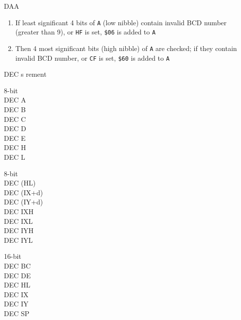 \begin{basedescript}{
    \desclabelstyle{\multilinelabel}
    \desclabelwidth{3cm}}
\begin{DetailItem}{DAA}
        \begin{enumerate}
            \item If least significant 4 bits of {\tt A} (low nibble) contain invalid BCD number (greater than 9), or {\tt HF} is set, {\tt \$06} is added to {\tt A}
            \item Then 4 most significant bits (high nibble) of {\tt A} are checked; if they contain invalid BCD number, or {\tt CF} is set, {\tt \$60} is added to {\tt A}
        \end{enumerate}
		
        \begin{DetailEffects}[p]
            \FlagsDAA
        \end{DetailEffects}
		
        \begin{DetailTiming}
        \end{DetailTiming}

    \end{DetailItem}

    \begin{DetailItem}{DEC s}
        {rement}
        {}

        \begin{DetailVariants}
            \textnormal{8-bit}\\
            DEC A\\
            DEC B\\
            DEC C\\
            DEC D\\
            DEC E\\
            DEC H\\
            DEC L

            \columnbreak
            \textnormal{8-bit}\\
            DEC (HL)\\
            DEC (IX+d)\\
            DEC (IY+d)\\
            DEC IXH\UNDOC\\
            DEC IXL\UNDOC\\
            DEC IYH\UNDOC\\
            DEC IYL\UNDOC

            \columnbreak
            \textnormal{16-bit}\\
            DEC BC\\
            DEC DE\\
            DEC HL\\
            DEC IX\\
            DEC IY\\
            DEC SP
        \end{DetailVariants}


\end{DetailItem}
\end{basedescript}
